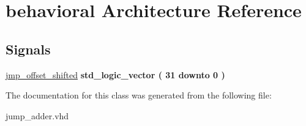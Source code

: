 \hypertarget{classjump__adder_1_1behavioral}{\section{behavioral \-Architecture \-Reference}
\label{classjump__adder_1_1behavioral}
}
\*
\*
\subsection*{\-Signals}
 \begin{DoxyCompactItemize}
\item 
\hypertarget{classjump__adder_1_1behavioral_ae087ef06435fa2f9d0677928ca02358e}{\hyperlink{classjump__adder_1_1behavioral_ae087ef06435fa2f9d0677928ca02358e}{jmp\-\_\-offset\-\_\-shifted} {\bfseries std\-\_\-logic\-\_\-vector (   31    downto    0  ) } }\label{classjump__adder_1_1behavioral_ae087ef06435fa2f9d0677928ca02358e}

\end{DoxyCompactItemize}


\-The documentation for this class was generated from the following file\-:\begin{DoxyCompactItemize}
\item 
jump\-\_\-adder.\-vhd\end{DoxyCompactItemize}
